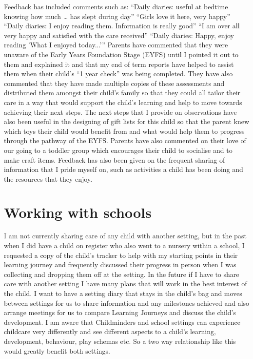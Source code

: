\documentclass[10pt,a4paper]{report}
\begin{document}
Feedback has included comments such as: “Daily diaries: useful at bedtime knowing how much … has slept during day” “Girls love it here, very happy” “Daily diaries: I enjoy reading them. Information is really good” “I am over all very happy and satisfied with the care received” “Daily diaries: Happy, enjoy reading 'What I enjoyed today...'”
Parents have commented that they were unaware of the Early Years Foundation Stage (EYFS) until I pointed it out to them and explained it and that my end of term reports have helped to assist them when their child's “1 year check” was being completed. They have also commented that they have made multiple copies of these assessments and distributed them amongst their child's family so that they could all tailor their care in a way that would support the child's learning and help to move towards achieving their next steps. The next steps that I provide on observations have also been useful in the designing of gift lists for this child so that the parent knew which toys their child would benefit from and what would help them to progress through the pathway of the EYFS. Parents have also commented on their love of our going to a toddler group which encourages their child to socialise and to make craft items. Feedback has also been given on the frequent sharing of information that I pride myself on, such as activities a child has been doing and the resources that they enjoy.

\section{Working with schools}

I am not currently sharing care of any child with another setting, but in the past when I did have a child on register who also went to a nursery within a school, I requested a copy of the child's tracker to help with my starting points in their learning journey and frequently discussed their progress in person when I was collecting and dropping them off at the setting. In the future if I have to share care with another setting I have many plans that will work in the best interest of the child. I want to have a setting diary that stays in the child's bag and moves between settings for us to share information and any milestones achieved and also arrange meetings for us to compare Learning Journeys and discuss the child's development. I am aware that Childminders and school settings can experience childcare very differently and see different aspects to a child's learning, development, behaviour, play schemas etc. So a two way relationship like this would greatly benefit both settings.
\end{document}
